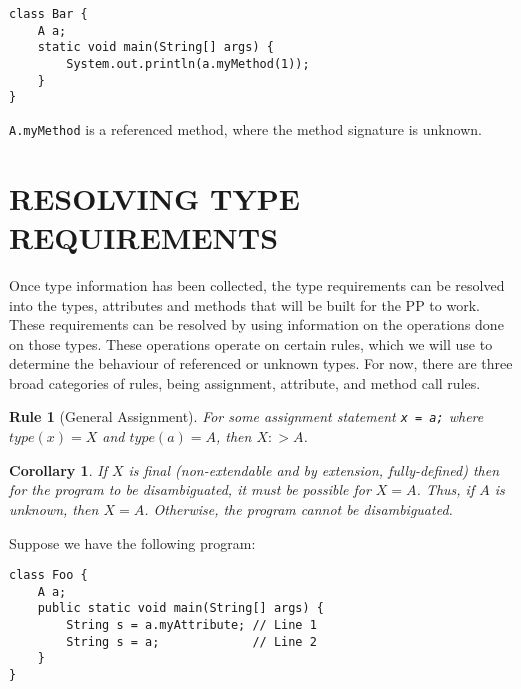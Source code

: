 \documentclass{article}
\newtheorem{inferencerule}{Rule}[section]
\newtheorem{inferencecorollary}{Corollary}[inferencerule]
\begin{document}
\begin{verbatim}
class Bar {
    A a;
    static void main(String[] args) {
        System.out.println(a.myMethod(1));
    }
}
\end{verbatim}
\noindent\texttt{A.myMethod} is a referenced method,
where the method signature is unknown.

\section{RESOLVING TYPE REQUIREMENTS}
Once type information has been collected, the type requirements can be resolved into
the types, attributes and methods that will be built for the PP to work. These requirements
can be resolved by using information on the operations done on those types. These operations
operate on certain rules, which we will use to determine the behaviour of referenced or 
unknown types. For now, there are three broad categories of rules, being assignment,
attribute, and method call rules.

\begin{inferencerule}[General Assignment]
For some assignment statement \texttt{x = a;} where $type(x) = X$
and $type(a) = A$, then $X:>A$.
\end{inferencerule}
\begin{inferencecorollary}
If $X$ is final (non-extendable and by extension, fully-defined) then for the
program to be disambiguated, it must be possible for $X=A$. Thus, if 
$A$ is unknown, then $X=A$. Otherwise, the program cannot be disambiguated.\\
\end{inferencecorollary}

\noindent Suppose we have the following program:

\begin{verbatim}
class Foo {
    A a;
    public static void main(String[] args) {
        String s = a.myAttribute; // Line 1
        String s = a;             // Line 2
    }
}
\end{verbatim}
\end{document}
